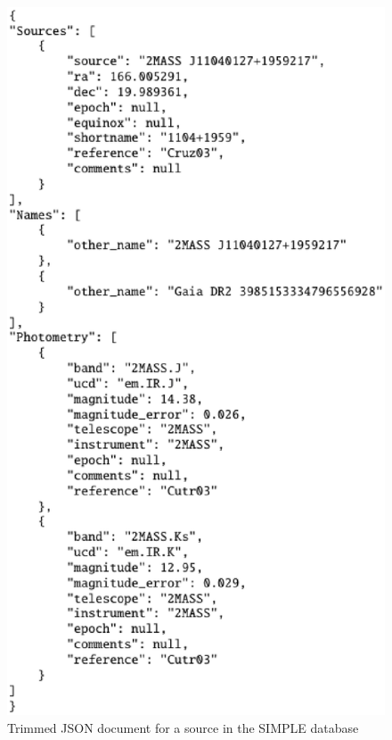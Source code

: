 \documentclass[11pt,twoside]{article}
\begin{document}
\begin{figure}
    \centering
    \includegraphics[height=0.9\textheight]{X0-012_f2.eps}
    \caption{Trimmed JSON document for a source in the SIMPLE database}
    \label{fig:json}
\end{figure}



% 


\end{document}
